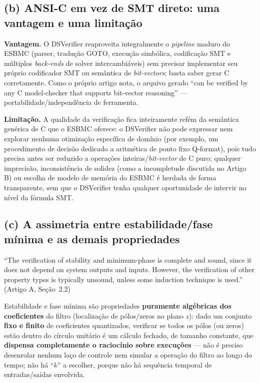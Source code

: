 \documentclass[12pt,a4paper]{article}
\begin{document}
\subsection{(b) ANSI-C em vez de SMT direto: uma vantagem e uma limitação}

\textbf{Vantagem.} O DSVerifier reaproveita integralmente o \emph{pipeline} maduro do ESBMC
(parser, tradu\c{c}\~ao GOTO, execu\c{c}\~ao simb\'olica, codifica\c{c}\~ao SMT e m\'ultiplos
\emph{back-ends} de solver intercambi\'aveis) sem precisar implementar seu pr\'oprio
codificador SMT ou sem\^antica de \emph{bit-vectors}; basta saber gerar C corretamente. Como o
pr\'oprio artigo nota, o arquivo gerado ``can be verified by any C model-checker that supports
bit-vector reasoning'' --- portabilidade/independ\^encia de ferramenta.

\textbf{Limita\c{c}\~ao.} A qualidade da verifica\c{c}\~ao fica inteiramente refém da
sem\^antica gen\'erica de C que o ESBMC oferece: o DSVerifier n\~ao pode expressar nem
explorar nenhuma otimiza\c{c}\~ao espec\'ifica de dom\'inio (por exemplo, um procedimento de
decis\~ao dedicado a aritm\'etica de ponto fixo Q-format), pois tudo precisa antes ser
reduzido a opera\c{c}\~oes inteiras/\emph{bit-vector} de C puro; qualquer imprecis\~ao,
inconsist\^encia de solidez (como a incompletude discutida no Artigo B) ou escolha de modelo
de mem\'oria do ESBMC \'e herdada de forma transparente, sem que o DSVerifier tenha qualquer
oportunidade de intervir no n\'ivel da f\'ormula SMT.

\subsection{(c) A assimetria entre estabilidade/fase mínima e as demais propriedades}

\begin{tcolorbox}[quotebox]
``The verification of stability and minimum-phase is complete and sound, since it does not
depend on system outputs and inputs. However, the verification of other property types is
typically unsound, unless some induction technique is used.'' (Artigo A, Se\c{c}\~ao~2.2)
\end{tcolorbox}

Estabilidade e fase m\'inima s\~ao propriedades \textbf{puramente alg\'ebricas dos
coeficientes} do filtro (localiza\c{c}\~ao de p\'olos/zeros no plano $z$): dado um conjunto
\textbf{fixo e finito} de coeficientes quantizados, verificar se todos os p\'olos (ou zeros)
est\~ao dentro do c\'irculo unit\'ario \'e um c\'alculo fechado, de tamanho constante, que
\textbf{dispensa completamente o racioc\'inio sobre execu\c{c}\~oes} --- n\~ao \'e preciso
desenrolar nenhum la\c{c}o de controle nem simular a opera\c{c}\~ao do filtro ao longo do
tempo; n\~ao h\'a ``$k$'' a escolher, porque n\~ao h\'a sequ\^encia temporal de entradas/sa\'idas
envolvida.
\end{document}
